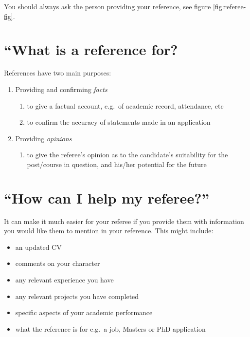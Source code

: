 \documentclass[
  12pt,
]{book}
\providecommand{\tightlist}{%
  \setlength{\itemsep}{0pt}\setlength{\parskip}{0pt}}
\begin{document}
You should always ask the person providing your reference, see figure \ref{fig:referee-fig}.

\hypertarget{for}{%
\section{``What is a reference for?}\label{for}}

References have two main purposes:

\begin{enumerate}
\def\labelenumi{\arabic{enumi}.}
\tightlist
\item
  Providing and confirming \emph{facts}

  \begin{enumerate}
  \def\labelenumii{\roman{enumii}.}
  \tightlist
  \item
    to give a factual account, e.g.~of academic record, attendance, etc
  \item
    to confirm the accuracy of statements made in an application
  \end{enumerate}
\item
  Providing \emph{opinions}

  \begin{enumerate}
  \def\labelenumii{\roman{enumii}.}
  \tightlist
  \item
    to give the referee's opinion as to the candidate's suitability for the post/course in
    question, and his/her potential for the future
  \end{enumerate}
\end{enumerate}

\hypertarget{help}{%
\section{``How can I help my referee?''}\label{help}}

It can make it much easier for your referee if you provide them with information you would like them to mention in your reference. This might include:

\begin{itemize}
\tightlist
\item
  an updated CV\\
\item
  comments on your character
\item
  any relevant experience you have
\item
  any relevant projects you have completed
\item
  specific aspects of your academic performance
\item
  what the reference is for e.g.~a job, Masters or PhD application
\end{itemize}
\end{document}
